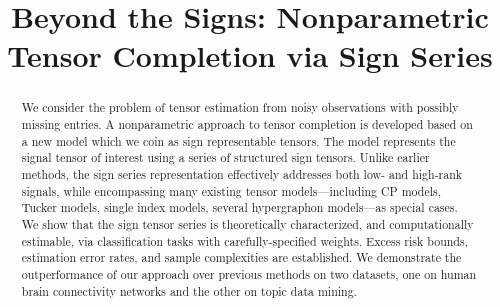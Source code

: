 \documentclass[useAMS,usenatbib,usegraphicx,referee]{biom}
\title[Beyond the Signs: Nonparametric Tensor Completion via Sign Series]{Beyond the Signs: Nonparametric Tensor Completion via Sign Series}
\theoremstyle{plain}
\theoremstyle{definition}
\begin{document}





\pagerange{\pageref{firstpage}--\pageref{lastpage}} 




\label{firstpage}


\begin{abstract}
We consider the problem of tensor estimation from noisy observations with possibly missing entries. A nonparametric approach to tensor completion is developed based on a new model which we coin as sign representable tensors. The model represents the signal tensor of interest using a series of structured sign tensors. Unlike earlier methods, the sign series representation effectively addresses both low- and high-rank signals, while encompassing many existing tensor models---including CP models, Tucker models, single index models, several hypergraphon models---as special cases. We show that the sign tensor series is theoretically characterized, and computationally estimable, via classification tasks with carefully-specified weights. Excess risk bounds, estimation error rates, and sample complexities are established. We demonstrate the outperformance of our approach over previous methods on two datasets, one on human brain connectivity networks and the other on topic data mining. \\
\end{abstract}
\end{document}

